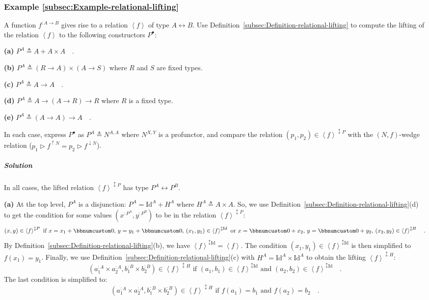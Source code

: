\subsubsection{Example \label{subsec:Example-relational-lifting}\ref{subsec:Example-relational-lifting}}

A function $f^{:A\rightarrow B}$ gives rise to a relation $\left<f\right>$
of type $A\leftrightarrow B$. Use Definition~\ref{subsec:Definition-relational-lifting}
to compute the lifting of the relation $\left<f\right>$ to the following
constructors $P^{\bullet}$:

\textbf{(a)} $P^{A}\triangleq A+A\times A\quad$.

\textbf{(b)} $P^{A}\triangleq(R\rightarrow A)\times(A\rightarrow S)$
where $R$ and $S$ are fixed types.

\textbf{(c)} $P^{A}\triangleq A\rightarrow A\quad$.

\textbf{(d)} $P^{A}\triangleq A\rightarrow\left(A\rightarrow R\right)\rightarrow R$
where $R$ is a fixed type.

\textbf{(e)} $P^{A}\triangleq\left(A\rightarrow A\right)\rightarrow A\quad$.

In each case, express $P^{\bullet}$ as $P^{A}\triangleq N^{A,A}$
where $N^{X,Y}$ is a profunctor, and compare the relation $(p_{1},p_{2})\in\left<f\right>^{\updownarrow P}$
with the $\left(N,f\right)$-wedge relation ($p_{1}\triangleright f^{\uparrow N}=p_{2}\triangleright f^{\downarrow N}$). 

\subparagraph{Solution}

In all cases, the lifted relation $\left<f\right>^{\updownarrow P}$
has type $P^{A}\leftrightarrow P^{B}$.

\textbf{(a)} At the top level, $P^{A}$ is a disjunction: $P^{A}=\text{Id}^{A}+H^{A}$
where $H^{A}\triangleq A\times A$. So, we use Definition~\ref{subsec:Definition-relational-lifting}(d)
to get the condition for some values $(x^{:P^{A}},y^{:P^{B}})$ to
be in the relation $\left<f\right>^{\updownarrow P}$:
\[
(x,y)\in\left<f\right>^{\updownarrow P}\text{ if }x=x_{1}+\bbnum 0,\,y=y_{1}+\bbnum 0,\,(x_{1},y_{1})\in\left<f\right>^{\updownarrow\text{Id}}\text{ or }x=\bbnum 0+x_{2},\,y=\bbnum 0+y_{2},\,(x_{2},y_{2})\in\left<f\right>^{\updownarrow H}\quad.
\]
By Definition~\ref{subsec:Definition-relational-lifting}(b), we
have $\left<f\right>^{\updownarrow\text{Id}}=\left<f\right>$. The
condition $(x_{1},y_{1})\in\left<f\right>^{\updownarrow\text{Id}}$
is then simplified to $f(x_{1})=y_{1}$. Finally, we use Definition~\ref{subsec:Definition-relational-lifting}(c)
with $H^{A}=\text{Id}^{A}\times\text{Id}^{A}$ to obtain the lifting
$\left<f\right>^{\updownarrow H}$:
\[
(a_{1}^{:A}\times a_{2}^{:A},b_{1}^{:B}\times b_{2}^{:B})\in\left<f\right>^{\updownarrow H}\text{ if }(a_{1},b_{1})\in\left<f\right>^{\updownarrow\text{Id}}\text{ and }(a_{2},b_{2})\in\left<f\right>^{\updownarrow\text{Id}}\quad.
\]
The last condition is simplified to:
\[
(a_{1}^{:A}\times a_{2}^{:A},b_{1}^{:B}\times b_{2}^{:B})\in\left<f\right>^{\updownarrow H}\text{ if }f(a_{1})=b_{1}\text{ and }f(a_{2})=b_{2}\quad.
\]

